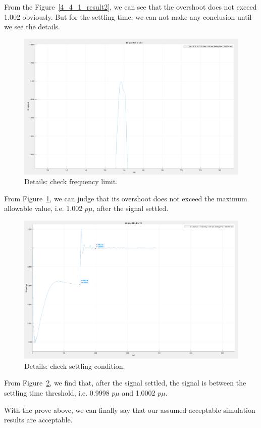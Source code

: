 From the Figure~\ref{4_4_1_result2}, we can see that the overshoot does not exceed 1.002 obviously. But for the settling time, we can not make any conclusion until we see the details.  


\begin{figure}[htbp]
\centering
\includegraphics[width = .819\textwidth]{figure/4_4_1_result3.png}
\caption{Details: check frequency limit.}
\label{4_4_1_result3}
\end{figure}

From Figure~\ref{4_4_1_result3}, we can judge that its overshoot does not exceed the maximum allowable value, i.e. 1.002 $p\mu$, after the signal settled. 

\begin{figure}[htbp]
\centering
\includegraphics[width = .819\textwidth]{figure/4_4_1_result4.png}
\caption{Details: check settling condition.}
\label{4_4_1_result4}
\end{figure}


From Figure~\ref{4_4_1_result4}, we find that, after the signal settled, the signal is between the settling time threshold, i.e. 0.9998 $p\mu$ and 1.0002 $p\mu$. 


With the prove above, we can finally say that our assumed acceptable simulation results are acceptable. 

